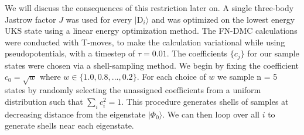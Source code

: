 \documentclass[12pt]{article}
\begin{document}
We will discuss the consequences of this restriction later on.
A single three-body Jastrow factor $J$ was used for every $|\text{D}_i\rangle$ and was optimized on the lowest energy UKS state using a linear energy optimization method.
The FN-DMC calculations were conducted with T-moves, to make the calculation variational while using pseudopotentials, with a timestep of $\tau = 0.01$.
The coefficients $\{c_j\}$ for our sample states were chosen via a shell-sampling method. 
We begin by fixing the coefficient $c_0 = \sqrt{w}$ where $w \in \{1.0, 0.8,..., 0.2\}$. 
For each choice of $w$ we sample n = 5 states by randomly selecting the unassigned coefficients from a uniform distribution such that $\sum_i c_i^2 = 1$. 
This procedure generates shells of samples at decreasing distance from the eigenstate $|\Phi_0\rangle$. 
We can then loop over all $i$ to generate shells near each eigenstate.
\end{document}
